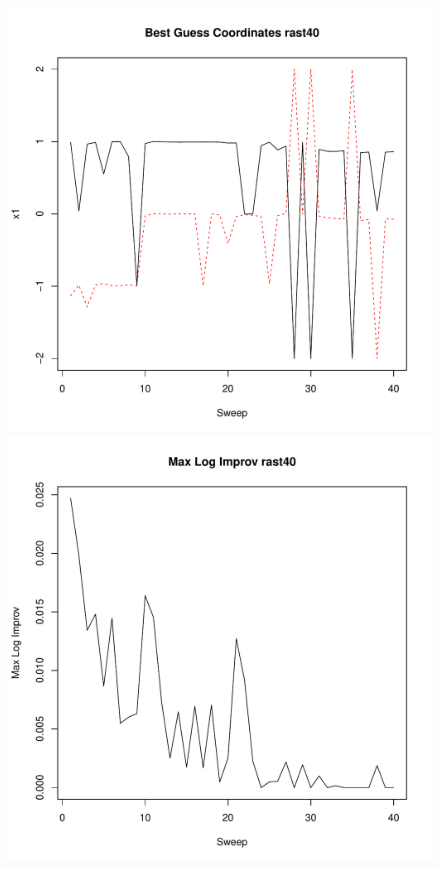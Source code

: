 \documentclass{article}
\begin{document}
\clearpage

\begin{figure}
	\begin{center}
		\begin{minipage}[h!]{0.49\textwidth}
			\includegraphics[width=1.0\textwidth]{rast40Coord.pdf}
		\end{minipage}
		\begin{minipage}[h!]{0.49\textwidth}
			\includegraphics[width=1.0\textwidth]{rast40MLI.pdf}	
		\end{minipage}
	\end{center}
\end{figure}
\end{document}
